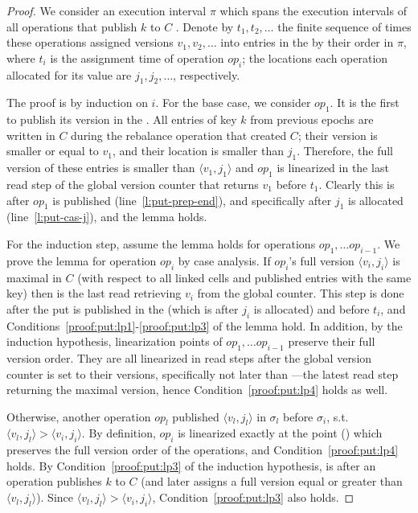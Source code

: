 \begin{proof}
We consider an execution interval $\pi$ which spans the execution intervals of all operations that publish $k$ to $C$ .
Denote by $t_1, t_2, \ldots $ the finite sequence of times these operations assigned versions $v_1, v_2, \ldots$ into entries in the  by their order in $\pi$, where $t_i$ is the assignment time of operation $op_i$; the locations each operation allocated for its value are $j_1, j_2, \ldots$, respectively.

The proof is by induction on $i$. For the base case, we consider $op_1$. It is the first to publish its version in the . 
All entries of key $k$ from previous epochs are written in $C$ during the rebalance operation that created $C$; their version is smaller or equal to $v_1$, and their location is smaller than $j_1$. 
Therefore, the full version of these entries is smaller than $\langle v_1, j_1\rangle$  and $op_1$ is linearized in the last read step of the global version counter that returns $v_1$ before $t_1$. Clearly this is after $op_1$ is published (line~\ref{l:put-prep-end}), and specifically after $j_1$ is allocated (line~\ref{l:put-cas-j}), and the lemma holds.

For the induction step, assume the lemma holds for operations $op_1, \ldots op_{i-1}$. We prove the lemma for operation $op_i$ by case analysis.
If $op_i$'s full version $\langle v_i, j_i\rangle$ is maximal in $C$ (with respect to all linked cells and published entries with the same key) then  is the last read retrieving $v_i$ from the global counter. This step is done after the put is published in the  (which is after $j_i$ is allocated) and before $t_i$, and Conditions~\ref{proof:put:lp1}-\ref{proof:put:lp3} of the lemma hold. In addition, by the induction hypothesis, linearization points of $op_1, \ldots op_{i-1}$ preserve their full version order. They are all linearized in read steps after the global version counter is set to their versions, specifically not later than ---the latest read step returning the maximal version, hence Condition~\ref{proof:put:lp4} holds as well.

Otherwise, another operation $op_l$ published $\langle v_l, j_l\rangle$ in $\sigma_l$ before $\sigma_i$, s.t. $\langle v_l, j_l\rangle > \langle v_i, j_i\rangle$. By definition, $op_i$ is linearized exactly at the point () which preserves the full version order of the operations, and Condition~\ref{proof:put:lp4} holds. By Condition~\ref{proof:put:lp3} of the induction hypothesis,  is after an operation publishes $k$ to $C$ (and later assigns a full version equal or greater than $\langle v_l, j_l\rangle$). Since $\langle v_l, j_l\rangle > \langle v_i, j_i\rangle$, Condition~\ref{proof:put:lp3} also holds. 


\end{proof}
